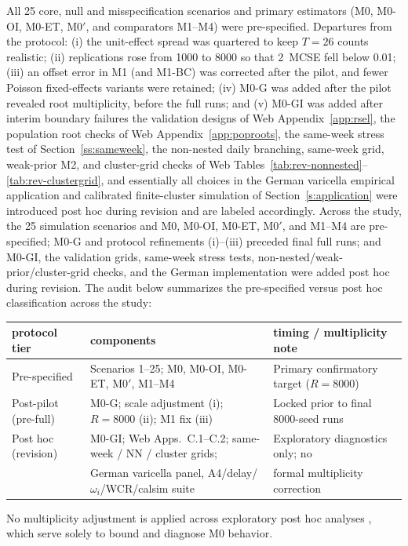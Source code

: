 All 25 core, null and misspecification scenarios and primary estimators (M0, M0-OI, M0-ET, M0$'$,
and comparators M1--M4) were pre-specified. Departures from the protocol: (i) the unit-effect spread
was quartered to keep $T=26$ counts realistic; (ii) replications rose from 1000 to 8000 so that
2~MCSE fell below 0.01; (iii) an offset error in M1 (and M1-BC) was corrected after the pilot, and
fewer Poisson fixed-effects variants were retained; (iv) M0-G was added after the pilot revealed
root multiplicity, before the full runs; and (v) M0-GI was added after interim boundary failures
the validation designs of Web Appendix~\ref{app:rsel}, the population root checks of Web
Appendix~\ref{app:poproots}, the same-week stress test of Section~\ref{ss:sameweek}, the
non-nested daily branching, same-week grid, weak-prior M2, and cluster-grid checks of Web
Tables~\ref{tab:rev-nonnested}--\ref{tab:rev-clustergrid}, and essentially all choices in the German
varicella empirical application and calibrated finite-cluster simulation of
Section~\ref{s:application} were introduced post hoc during revision and are labeled
accordingly. Across the study, the 25 simulation scenarios and M0, M0-OI, M0-ET, M0$'$, and M1--M4 are
pre-specified; M0-G and protocol refinements (i)--(iii) preceded final full runs; and M0-GI, the
validation grids, same-week stress tests, non-nested/weak-prior/cluster-grid checks, and the German
implementation were added post hoc during revision. The audit below summarizes the pre-specified
versus post hoc classification across the study:
\begin{center}
\footnotesize
\setlength{\tabcolsep}{4pt}
\begin{tabular}{lll}
\toprule
protocol tier & components & timing / multiplicity note \\
\midrule
Pre-specified & Scenarios 1--25; M0, M0-OI, M0-ET, M0$'$, M1--M4 & Primary confirmatory target ($R=8000$) \\
Post-pilot (pre-full) & M0-G; scale adjustment (i); $R=8000$ (ii); M1 fix (iii) & Locked prior to final 8000-seed runs \\
Post hoc (revision) & M0-GI; Web Apps.\ C.1--C.2; same-week / NN / cluster grids; & Exploratory diagnostics only; no \\
                    & German varicella panel, A4/delay/$\omega_i$/WCR/calsim suite & formal multiplicity correction \\
\bottomrule
\end{tabular}
\end{center}
No multiplicity adjustment is applied across exploratory post hoc analyses \citep{weill2021flexibility}, which serve solely to bound
and diagnose M0 behavior.

